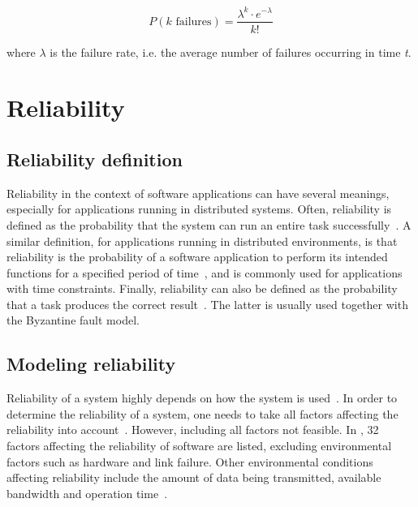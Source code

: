 \documentclass{cslthse-msc}
\begin{document}
\begin{equation} \label{eq:Poisson}
P(k \mbox{ failures}) = \dfrac{\lambda^k \cdot e^{-\lambda}}{k!}
\end{equation}

where $\lambda$ is the failure rate, i.e. the average number of failures occurring in time \emph{t}. 

\section{Reliability} \label{sec:background_reliability}
\subsection{Reliability definition} \label{subsec:background_reliability_definition}
Reliability in the context of software applications can have several meanings, especially for applications running in distributed systems. Often, reliability is defined as the probability that the system can run an entire task successfully~\cite{taskAllocation, relModelDistSimSystem, studyServiceRel, hierarchicalRelModeling, generalAlgoRelEval, realTimeRelAnalysis, perfRelNonMarkovian}. A similar definition, for applications running in distributed environments, is that reliability is the probability of a software application to perform its intended functions for a specified period of time~\cite{surveyReliabilityDistr, surveyRelPrediction, relDistApplications}, and is commonly used for applications with time constraints. Finally, reliability can also be defined as the probability that a task produces the correct result~\cite{surveyRelPrediction, relAndPerfGridServices, relGridServicePredConstraint, relModelWebServices, selfAdaptRel}. The latter is usually used together with the Byzantine fault model. 

\subsection{Modeling reliability} \label{subsec:background_modeling_rel}
Reliability of a system highly depends on how the system is used~\cite{surveyRelPrediction}. In order to determine the reliability of a system, one needs to take all factors affecting the reliability into account~\cite{surveyReliabilityDistr}. However, including all factors not feasible. In \cite{factorsAffectingRel}, 32 factors affecting the reliability of software are listed, excluding environmental factors such as hardware and link failure. Other environmental conditions affecting reliability include the amount of data being transmitted, available bandwidth and operation time~\cite{cloudServiceRel, hierarchicalRelModeling}.
\end{document}
